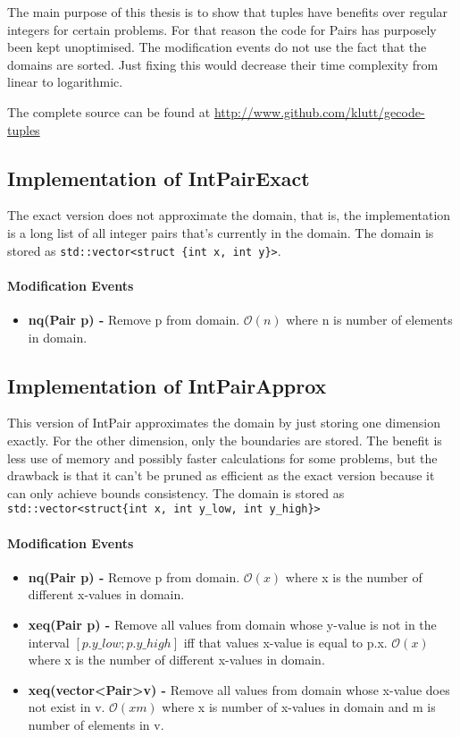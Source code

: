 \documentclass[a4paper,11pt]{article}
\begin{document}
The main purpose of this thesis is to show that tuples have benefits over regular integers for certain problems. For that reason the code for Pairs has purposely been kept unoptimised. The modification events do not use the fact that the domains are sorted. Just fixing this would decrease their time complexity from linear to logarithmic.

The complete source can be found at \url{http://www.github.com/klutt/gecode-tuples}

\subsection{Implementation of IntPairExact}
The exact version does not approximate the domain, that is, the implementation is a long list of all integer pairs that's currently in the domain. The domain is stored as \texttt{std::vector<struct \{int x, int y\}>}. 

\paragraph{Modification Events}
\begin{itemize}
\item {\textbf{nq(Pair p) - }} Remove p from domain. $\mathcal{O}(n)$ where n is number of elements in domain.
\end{itemize}
\subsection{Implementation of IntPairApprox}
This version of IntPair approximates the domain by just storing one dimension exactly. For the other dimension, only the boundaries are stored. The benefit is less use of memory and possibly faster calculations for some problems, but the drawback is that it can't be pruned as efficient as the exact version because it can only achieve bounds consistency. The domain is stored as \texttt{std::vector<struct\{int x, int y\_low, int y\_high\}>}

\paragraph{Modification Events}
\begin{itemize}
\item {\textbf{nq(Pair p) - }} Remove p from domain. $\mathcal{O}(x)$ where x is the number of different x-values in domain.
\item{\textbf{xeq(Pair p) - }} Remove all values from domain whose y-value is not in the interval $[p.y\_low; p.y\_high]$ iff that values x-value is equal to p.x. $\mathcal{O}(x)$ where x is the number of different x-values in domain.
\item{\textbf{xeq(vector\textless Pair\textgreater v) - }} Remove all values from domain whose x-value does not exist in v. $\mathcal{O}(xm)$ where x is number of x-values in domain and m is number of elements in v.
\end{itemize}
\end{document}
